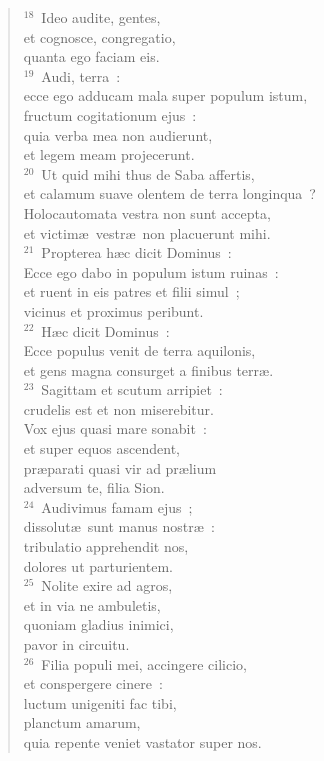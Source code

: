 \begin{flushleft}
\begin{verse}
${}^{18}$~Ideo audite, gentes,\\ et cognosce, congregatio,\\ quanta ego faciam eis.\\
${}^{19}$~Audi, terra~:\\ ecce ego adducam mala super populum istum,\\ fructum cogitationum ejus~:\\ quia verba mea non audierunt,\\ et legem meam projecerunt.\\
${}^{20}$~Ut quid mihi thus de Saba affertis,\\ et calamum suave olentem de terra longinqua~?\\ Holocautomata vestra non sunt accepta,\\ et victim\ae\ vestr\ae\ non placuerunt mihi.\\
${}^{21}$~Propterea h\ae c dicit Dominus~:\\ Ecce ego dabo in populum istum ruinas~:\\ et ruent in eis patres et filii simul~;\\ vicinus et proximus peribunt.\\
${}^{22}$~H\ae c dicit Dominus~:\\ Ecce populus venit de terra aquilonis,\\ et gens magna consurget a finibus terr\ae .\\
${}^{23}$~Sagittam et scutum arripiet~:\\ crudelis est et non miserebitur.\\ Vox ejus quasi mare sonabit~:\\ et super equos ascendent,\\ pr\ae parati quasi vir ad pr\ae lium\\ adversum te, filia Sion.\\
${}^{24}$~Audivimus famam ejus~;\\ dissolut\ae\ sunt manus nostr\ae~:\\ tribulatio apprehendit nos,\\ dolores ut parturientem.\\
${}^{25}$~Nolite exire ad agros,\\ et in via ne ambuletis,\\ quoniam gladius inimici,\\ pavor in circuitu.\\
${}^{26}$~Filia populi mei, accingere cilicio,\\ et conspergere cinere~:\\ luctum unigeniti fac tibi,\\ planctum amarum,\\ quia repente veniet vastator super nos.\\

\end{verse}
\end{flushleft}
